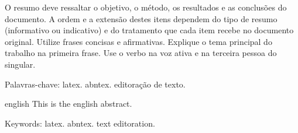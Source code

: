 \setlength{\absparsep}{18pt} 


\begin{resumo}
    O resumo deve ressaltar o objetivo, o método, os resultados e as conclusões do documento. A ordem e a extensão destes itens dependem do tipo de resumo (informativo ou indicativo) e do tratamento que cada item recebe no documento original. Utilize frases concisas e afirmativas. Explique o tema principal do trabalho na primeira frase. Use o verbo na voz ativa e na terceira pessoa do singular. 
    
    Palavras-chave: latex. abntex. editoração de texto.
\end{resumo}



\begin{resumo}[Abstract]
\begin{otherlanguage*}{english}
    This is the english abstract.
\vspace{\onelineskip}

\noindent 
Keywords: latex. abntex. text editoration.
\end{otherlanguage*}
\end{resumo}
